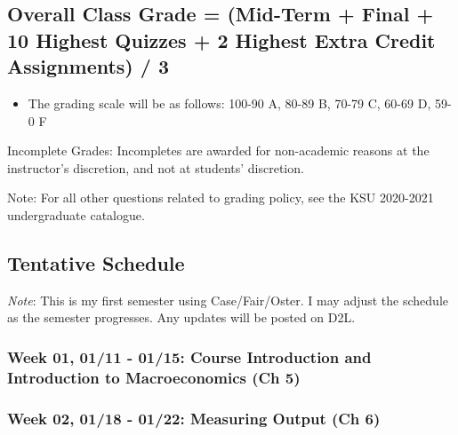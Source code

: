 \documentclass[11pt,]{article}
\providecommand{\tightlist}{%
  \setlength{\itemsep}{0pt}\setlength{\parskip}{0pt}}
\begin{document}
\hypertarget{overall-class-grade-mid-term-final-10-highest-quizzes-2-highest-extra-credit-assignments-3}{%
\subsection{Overall Class Grade = (Mid-Term + Final + 10 Highest Quizzes + 2 Highest Extra Credit Assignments) / 3}\label{overall-class-grade-mid-term-final-10-highest-quizzes-2-highest-extra-credit-assignments-3}}

\begin{itemize}
\tightlist
\item
  The grading scale will be as follows: 100-90 A, 80-89 B, 70-79 C, 60-69 D, 59-0 F
\end{itemize}

Incomplete Grades: Incompletes are awarded for non-academic reasons at the instructor's discretion, and
not at students' discretion.

Note: For all other questions related to grading policy, see the KSU 2020-2021 undergraduate catalogue.
\newpage

\hypertarget{tentative-schedule}{%
\subsection*{Tentative Schedule}\label{tentative-schedule}}

\emph{Note}: This is my first semester using Case/Fair/Oster. I may adjust the schedule as the semester progresses. Any updates will be posted on D2L.

\hypertarget{week-01-0111---0115-course-introduction-and-introduction-to-macroeconomics-ch-5}{%
\subsubsection*{Week 01, 01/11 - 01/15: Course Introduction and Introduction to Macroeconomics (Ch 5)}\label{week-01-0111---0115-course-introduction-and-introduction-to-macroeconomics-ch-5}}

\hypertarget{week-02-0118---0122-measuring-output-ch-6}{%
\subsubsection*{Week 02, 01/18 - 01/22: Measuring Output (Ch 6)}\label{week-02-0118---0122-measuring-output-ch-6}}
\end{document}
